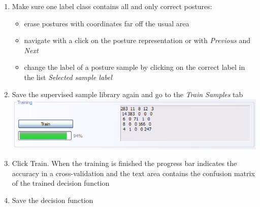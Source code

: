 \begin{enumerate}
\item Make sure one label class contains all and only correct postures: 
\begin{itemize}
\item erase postures with coordinates far off the usual area
\item navigate with a click on the posture representation or with \textit{Previous} and \textit{Next}
\item change the label of a posture sample by clicking on the correct label in the list \textit{Selected sample label}
\end{itemize}
\item Save the supervised sample library again and go to the \textit{Train Samples} tab\\
\includegraphics[scale=0.75]{images/train} 
\item Click Train. When the training is finished the progress bar indicates the accuracy in a cross-validation and the text area contains the confusion matrix of the trained decision function
\item Save the decision function
\end{enumerate}
\clearpage


